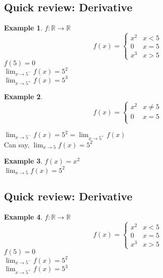 \documentclass[twocolumn,20pt,fleqn]{extarticle}
\theoremstyle{plain}
\theoremstyle{definition}
\newtheorem*{example}{Example}
\theoremstyle{remark}
\begin{document}
\clearpage



\subsection{Quick review: Derivative}
\begin{example}
  $f : \mathbb{R}\to \mathbb{R}$
  \[f(x) =
      \begin{cases}
        x^2 & x < 5\\
        0 & x = 5\\
        x^3 & x > 5
      \end{cases}
      \]
      $f(5)=0$\\
$\displaystyle\lim_{x \to 5^-} f(x)  = 5^2$\\
$\displaystyle\lim_{x \to 5^+} f(x)  = 5^3$
\end{example}


\begin{example}
  \[f(x) =
      \begin{cases}
        x^2 & x  \neq  5\\
        0 & x = 5\\
        
      \end{cases}
      \]
      
      


$\displaystyle\lim_{x \to 5^-} f(x) = 5^2  = \displaystyle\lim_{x \to 5^+} f(x)$\\
Can say, $\displaystyle\lim_{x \to 5} f(x) = 5^2$
\end{example}

\newpage
\begin{example}
$f(x) = x^2$\\
$\displaystyle\lim_{x \to 5} f(x) = 5^2 $\end{example}


\clearpage



\subsection{Quick review: Derivative}
\begin{example}
  $f : \mathbb{R}\to \mathbb{R}$
  \[f(x) =
      \begin{cases}
        x^2 & x < 5\\
        0 & x = 5\\
        x^3 & x > 5
      \end{cases}
      \]
      $f(5)=0$\\
$\displaystyle\lim_{x \to 5^-} f(x)  = 5^2$\\
$\displaystyle\lim_{x \to 5^+} f(x)  = 5^3$
\end{example}
\end{document}
